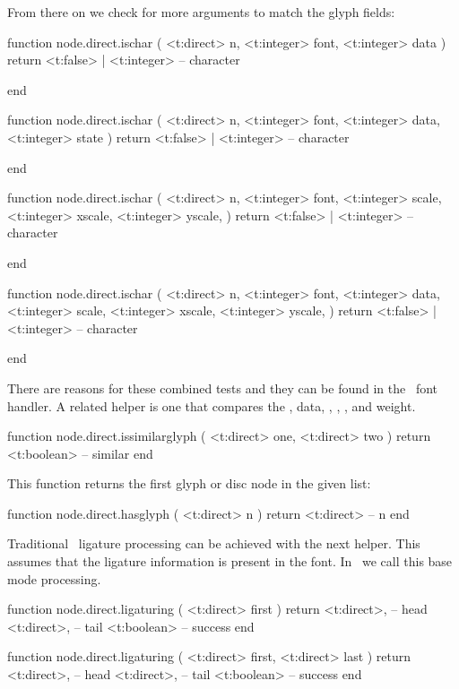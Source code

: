 From there on we check for more arguments to match the glyph fields:

\starttyping[option=LUA]
function node.direct.ischar (
    <t:direct>  n,
    <t:integer> font,
    <t:integer> data
)
    return <t:false> | <t:integer> -- character

end

function node.direct.ischar (
    <t:direct>  n,
    <t:integer> font,
    <t:integer> data,
    <t:integer> state
)
    return <t:false> | <t:integer> -- character

end

function node.direct.ischar (
    <t:direct>  n,
    <t:integer> font,
    <t:integer> scale,
    <t:integer> xscale,
    <t:integer> yscale,
)
    return <t:false> | <t:integer> -- character

end

function node.direct.ischar (
    <t:direct>  n,
    <t:integer> font,
    <t:integer> data,
    <t:integer> scale,
    <t:integer> xscale,
    <t:integer> yscale,
)
    return <t:false> | <t:integer> -- character

end
\stoptyping

There are reasons for these combined tests and they can be found in the \CONTEXT\
font handler. A related helper is one that compares the , \type
{data}, \type {scale}, \type {xscale}, \type {yscale}, \type {slant} and \type
{weight}.

\starttyping[option=LUA]
function node.direct.issimilarglyph ( <t:direct>  one, <t:direct> two )
    return <t:boolean> -- similar
end
\stoptyping

This function returns the first glyph or disc node in the given list:

\starttyping[option=LUA]
function node.direct.hasglyph ( <t:direct> n )
    return <t:direct> -- n
end
\stoptyping

Traditional \TEX\ ligature processing can be achieved with the next helper. This
assumes that the ligature information is present in the font. In \CONTEXT\ we
call this base mode processing.

\starttyping[option=LUA]
function node.direct.ligaturing ( <t:direct> first )
    return
        <t:direct>, -- head
        <t:direct>, -- tail
        <t:boolean> -- success
end

function node.direct.ligaturing ( <t:direct> first, <t:direct> last )
    return
        <t:direct>, -- head
        <t:direct>, -- tail
        <t:boolean> -- success
end
\stoptyping

